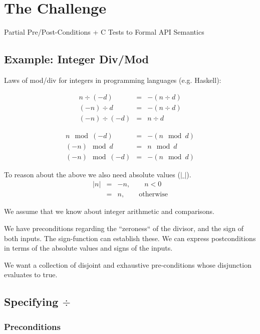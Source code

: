 \section{The Challenge}

Partial Pre/Post-Conditions + C Tests to Formal API Semantics

\subsection{Example: Integer Div/Mod}

Laws of mod/div for integers in programming languages (e.g. Haskell):

\begin{eqnarray*}
   n \div (-d)    &=& -(n \div d)
\\ (-n) \div d    &=& -(n \div d)
\\ (-n) \div (-d) &=& n \div d
\end{eqnarray*}

\begin{eqnarray*}
   n \mod (-d)    &=& -(n \mod d)
\\ (-n) \mod d    &=& n \mod d
\\ (-n) \mod (-d) &=& -(n \mod d) 
\end{eqnarray*}

\def\abs#1{|{\!#1\!}|}


To reason about the above we also need absolute values ($\abs{\_}$).
\begin{eqnarray*}
   \abs n  &=& -n, \qquad n < 0
\\         &=& n, \qquad \text{otherwise}
\end{eqnarray*}

We assume that we know about integer arithmetic and comparisons.

We have preconditions regarding the ``zeroness`` of the divisor,
and the sign of both inputs. The sign-function can establish these.
We can express postconditions in terms of 
the absolute values and signs of the inputs.

We want a collection of disjoint and exhaustive
pre-conditions whose disjunction evaluates to true.

\newpage

\subsection{Specifying $\div$}

\subsubsection{Preconditions}

